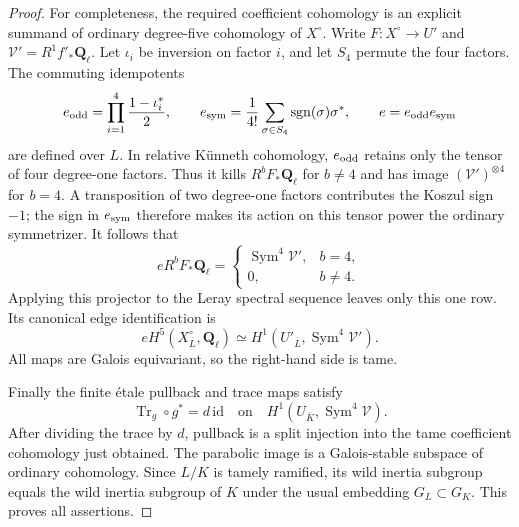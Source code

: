 \begin{proof}
For completeness, the required coefficient cohomology is an
 explicit summand of ordinary degree-five cohomology of
 $X^\circ$.  Write $F:X^\circ\to U'$ and
 $\mathcal V'=R^1f'_*\mathbf Q_\ell$.  Let $\iota_i$ be inversion
 on factor $i$, and let $S_4$ permute the four factors.  The commuting
 idempotents
\[
 e_{\rm odd}=\prod_{i=1}^4\frac{1-\iota_i^*}{2},\qquad
 e_{\rm sym}=\frac1{4!}\sum_{\sigma\in S_4}
                 \operatorname{sgn}(\sigma)\sigma^*,\qquad
 e=e_{\rm odd}e_{\rm sym}
\]
are defined over $L$.  In relative K\"unneth cohomology,
 $e_{\rm odd}$ retains only the tensor of four degree-one factors.
Thus it kills $R^bF_*\mathbf Q_\ell$ for $b\ne4$ and has image
 $(\mathcal V')^{\otimes4}$ for $b=4$.  A transposition of two
 degree-one factors contributes the Koszul sign $-1$; the sign in
 $e_{\rm sym}$ therefore makes its action on this tensor power
 the ordinary symmetrizer.  It follows that
\[
 eR^bF_*\mathbf Q_\ell=
 \begin{cases}
 \operatorname{Sym}^4\mathcal V',&b=4,\\
 0,&b\ne4.
 \end{cases}
\]
Applying this projector to the Leray spectral sequence leaves
 only this one row.  Its canonical edge identification is
\[
 eH^5(X^\circ_{\overline L},\mathbf Q_\ell)
   \simeq H^1(U'_{\overline L},
                    \operatorname{Sym}^4\mathcal V').
\]
All maps are Galois equivariant, so the right-hand side is tame.

Finally the finite \'etale pullback and trace maps satisfy
\[
 \operatorname{Tr}_g\circ g^*=d\,\mathrm{id}
 \quad\text{on}\quad
 H^1(U_{\overline K},\operatorname{Sym}^4\mathcal V).
\]
After dividing the trace by $d$, pullback is a split injection
 into the tame coefficient cohomology just obtained.  The
 parabolic image is a Galois-stable subspace of ordinary
 cohomology.  Since $L/K$ is tamely ramified, its wild inertia
 subgroup equals the wild inertia subgroup of $K$ under the
 usual embedding $G_L\subset G_K$.  This proves all assertions.
\end{proof}


